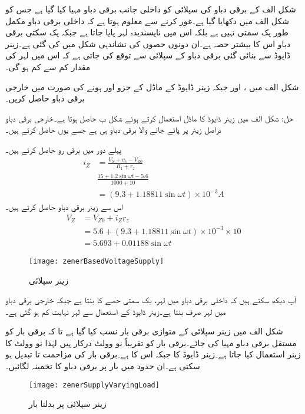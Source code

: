 

شکل  الف  کے برقی دباو کی سپلائی کو داخلی جانب برقی دباو مہیا کیا گیا ہے جس کو شکل  الف میں دکھایا گیا ہے۔غور کرنے سے معلوم ہوتا ہے کہ داخلی برقی دباو مکمل طور یک سمتی نہیں ہے بلکہ اس میں ناپسندیدہ لہر  پایا جاتا ہے جبکہ یک سکتی برقی دباو   اس کا بیشتر حصہ ہے۔ان دونوں حصوں کی نشاندہی شکل میں کی گئی ہے۔زینر ڈایوڈ سے بنائی گئی برقی دباو کے سپلائی سے توقع کی جاتی ہے کہ اس میں لہر کی مقدار کم سے کم ہو گی۔

شکل  الف میں ،  اور  جبکہ زینر ڈایوڈ کے ماڈل کے جزو  اور  ہونے کی صورت میں خارجی برقی دباو  حاصل کریں۔

حل:	شکل  الف میں زینر ڈایوڈ کا ماڈل استعمال کرتے ہوئے شکل  ب حاصل ہوتا ہے۔خارجی برقی دباو دراصل زینر پر پائے جانے والا برقی دباو  ہی ہے جسے یوں حاصل کرتے ہیں۔

پہلے دور میں برقی رو حاصل کرتے ہیں۔
\begin{align*}
i_Z&=\frac{V_S+v_s-V_{Z0}}{R_1+r_z}\\
&\frac{15+1.2 \sin \omega t -5.6}{1000+10}\\
&=\left (9.3+1.18811 \sin \omega t \right ) \times 10^{-3} A
\end{align*}
اس سے زینر برقی دباو حاصل کرتے ہیں۔
\begin{align*}
V_Z&=V_{Z0}+i_Z r_z\\
&=5.6+\left (9.3+1.18811 \sin \omega t \right ) \times 10^{-3} \times 10\\
&=5.693+0.01188 \sin \omega t
\end{align*}
%
\begin{figure}
\centering
\texttt{[image: zenerBasedVoltageSupply]}
\caption{زینر سپلائی}
\label{شکل_زینر_سپلائی}
\end{figure}
آپ دیکھ سکتے ہیں کہ داخلی برقی دباو میں لہر، یک سمتی حصے کا    بنتا ہے جبکہ خارجی برقی دباو میں لہر صرف   بنتا ہے۔زینر ڈایوڈ کے استعمال سے لہر نہایت کم ہو گئی ہے۔

شکل  الف میں زینر سپلائی کے متوازی برقی بار  نسب کیا گیا ہے تا کہ برقی بار کو مستقل برقی دباو مہیا کی جائے۔برقی بار کو تقریباً نو وولٹ درکار ہیں لہٰذا نو وولٹ کا زینر استعمال کیا جاتا ہے۔زینر ڈایوڈ کا  جبکہ اس کا  ہے۔برقی بار کی مزاحمت  تا  تبدیل ہو سکتی ہے۔ان حدود میں بار پر برقی دباو  کا تخمینہ لگائیں۔
\begin{figure}
\centering
\texttt{[image: zenerSupplyVaryingLoad]}
\caption{زینر سپلائی پر بدلتا بار}
\label{شکل_زینر_سپلائی_بدلتا_بار}
\end{figure}

